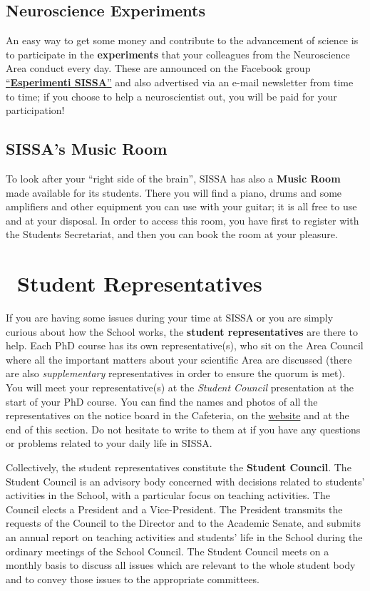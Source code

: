\documentclass{sissavademecum}
\begin{document}
\section{Neuroscience Experiments}

An easy way to get some money and contribute to the advancement of science is to participate in the \textbf{experiments} that your colleagues from the Neuroscience Area conduct every day. These are announced on the Facebook group \href{https://www.facebook.com/groups/144096472323480}{``\textbf{Esperimenti SISSA}''} and also advertised via an e-mail newsletter from time to time; if you choose to help a neuroscientist out, you will be paid for your participation!

\section{SISSA's Music Room}

To look after your ``right side of the brain'', SISSA has also a \textbf{Music Room} made available for its students. There you will find a piano, drums and some amplifiers and other equipment you can use with your guitar; it is all free to use and at your disposal. In order to access this room, you have first to register with the Students Secretariat, and then you can book the room at your pleasure.

\chapter{\texorpdfstring{\faFlag\ }{}Student Representatives}

If you are having some issues during your time at SISSA or you are simply curious about how the School works, the \textbf{student representatives} are there to help. Each PhD course has its own representative(s), who sit on the Area Council where all the important matters about your scientific Area are discussed (there are also \textit{supplementary} representatives in order to ensure the quorum is met). You will meet your representative(s) at the \emph{Student Council} presentation at the start of your PhD course. You can find the names and photos of all the representatives on the notice board in the Cafeteria, on the \href{http://students.sissa.it/}{website} and at the end of this section. Do not hesitate to write to them at  if you have any questions or problems related to your daily life in SISSA.

Collectively, the student representatives constitute the \textbf{Student Council}. The Student Council is an advisory body concerned with decisions related to students' activities in the School, with a particular focus on teaching activities. The Council elects a President and a Vice-President. The President transmits the requests of the Council to the Director and to the Academic Senate, and submits an annual report on teaching activities and students' life in the School during the ordinary meetings of the School Council. The Student Council meets on a monthly basis to discuss all issues which are relevant to the whole student body and to convey those issues to the appropriate committees.
\end{document}
